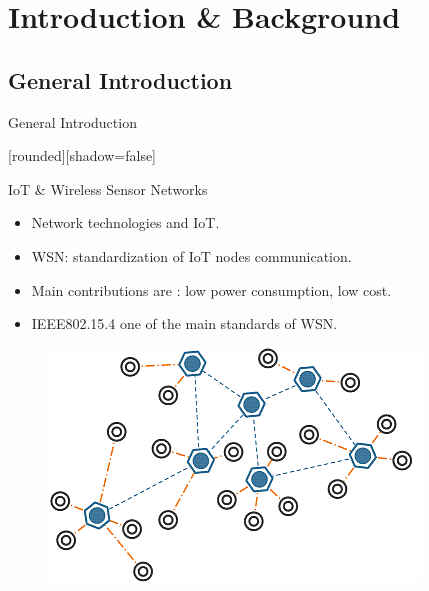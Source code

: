 \section{Introduction \& Background}

\subsection{General Introduction}
\begin{withoutheadline}
\begin{frame}{ General Introduction}


[rounded][shadow=false]

\begin{block}{ IoT \& Wireless Sensor Networks}
    \begin{itemize}
    \item Network technologies and IoT. 
    \item<2-> WSN: standardization of IoT nodes communication.
    \item<3-> Main contributions are : low power consumption, low cost.
    \item<4->  IEEE802.15.4 one of the main standards of WSN. 
    \end{itemize}
    \end{block}

 \begin{figure}[p]

\includegraphics[width=0.5\linewidth]{figures/wsn.png}
  
\end{figure}

\end{frame}
\end{withoutheadline}


